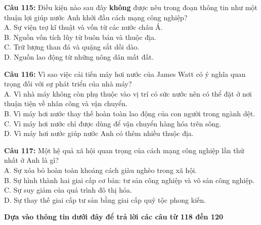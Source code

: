 \documentclass[12pt,a4paper]{article}
\begin{document}

\noindent \textbf{Câu 115:} Điều kiện nào sau đây \textbf{không} được nêu trong đoạn thông tin như một thuận lợi giúp nước Anh khởi đầu cách mạng công nghiệp?\\
\noindent A. Sự viện trợ kĩ thuật và vốn từ các nước châu Á.\\
\noindent B. Nguồn vốn tích lũy từ buôn bán và thuộc địa.\\
\noindent C. Trữ lượng than đá và quặng sắt dồi dào.\\
\noindent D. Nguồn lao động từ những nông dân mất đất.



\vspace{0.3cm}

\noindent \textbf{Câu 116:} Vì sao việc cải tiến máy hơi nước của James Watt có ý nghĩa quan trọng đối với sự phát triển của nhà máy?\\
\noindent A. Vì nhà máy không còn phụ thuộc vào vị trí có sức nước nên có thể đặt ở nơi thuận tiện về nhân công và vận chuyển.\\
\noindent B. Vì máy hơi nước thay thế hoàn toàn lao động của con người trong ngành dệt.\\
\noindent C. Vì máy hơi nước chỉ được dùng để vận chuyển hàng hóa trên sông.\\
\noindent D. Vì máy hơi nước giúp nước Anh có thêm nhiều thuộc địa.



\vspace{0.3cm}

\noindent \textbf{Câu 117:} Một hệ quả xã hội quan trọng của cách mạng công nghiệp lần thứ nhất ở Anh là gì?\\
\noindent A. Sự xóa bỏ hoàn toàn khoảng cách giàu nghèo trong xã hội.\\
\noindent B. Sự hình thành hai giai cấp cơ bản: tư sản công nghiệp và vô sản công nghiệp.\\
\noindent C. Sự suy giảm của quá trình đô thị hóa.\\
\noindent D. Sự thay thế giai cấp tư sản bằng giai cấp quý tộc phong kiến.



\vspace{0.5cm}
\noindent\textbf{Dựa vào thông tin dưới đây để trả lời các câu từ 118 đến 120}%
\end{document}
